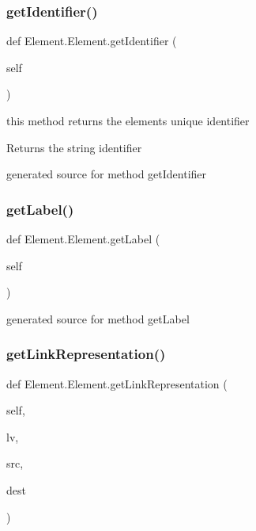 \subsubsection{\texorpdfstring{get\+Identifier()}{getIdentifier()}}
{\footnotesize\ttfamily def Element.\+Element.\+get\+Identifier (\begin{DoxyParamCaption}\item[{}]{self }\end{DoxyParamCaption})}



this method returns the element\textquotesingle{}s unique identifier 

\begin{DoxyReturn}{Returns}
the string identifier\begin{DoxyVerb}generated source for method getIdentifier \end{DoxyVerb}
 
\end{DoxyReturn}
\hypertarget{class_element_1_1_element_a52a3e2777d110a86950a6e88dfcdd0a4}{}\label{class_element_1_1_element_a52a3e2777d110a86950a6e88dfcdd0a4} 
\subsubsection{\texorpdfstring{get\+Label()}{getLabel()}}
{\footnotesize\ttfamily def Element.\+Element.\+get\+Label (\begin{DoxyParamCaption}\item[{}]{self }\end{DoxyParamCaption})}

\begin{DoxyVerb}generated source for method getLabel \end{DoxyVerb}
 \hypertarget{class_element_1_1_element_a87e09915bdcd4d07efb293d54ca5b270}{}\label{class_element_1_1_element_a87e09915bdcd4d07efb293d54ca5b270} 
\subsubsection{\texorpdfstring{get\+Link\+Representation()}{getLinkRepresentation()}}
{\footnotesize\ttfamily def Element.\+Element.\+get\+Link\+Representation (\begin{DoxyParamCaption}\item[{}]{self,  }\item[{}]{lv,  }\item[{}]{src,  }\item[{}]{dest }\end{DoxyParamCaption})}

